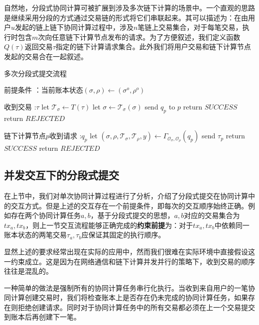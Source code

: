 自然地，分段式协同计算可被扩展到涉及多次链下计算的场景中。一个直观的思路是继续采用分段的方式通过交易链的形式将它们串联起来。其可以描述为：在由用户$u$发起的链上链下协同计算过程中，涉及$n$笔链上交易集合，对于每笔交易，执行时包含$m$次向任意链下计算节点发布的请求。为了方便叙述，我们定义函数$Q(\tau)$返回交易$\tau$指定的链下计算请求集合。此外我们将用户交易和链下计算节点发起的交易合在一起叙述。
\begin{breakablealgorithm}
    \caption{多次分段式提交流程}
    \label{alg:ch4-2}
    \begin{algorithmic} 
        \item[前提条件]：当前账本状态$(\sigma, \rho) \leftarrow (\sigma^o, \rho^o)$
        \item[收到交易]:$\tau$
        \STATE let $\mathcal{T}_\sigma \leftarrow T(\tau)$
        \STATE let $\sigma \leftarrow \mathcal{T}_\sigma(\sigma)$
        \STATE send $q_p$ to $p$
        \ENDFOR
        \STATE return $SUCCESS$
        \ENDIF
        \STATE return $REJECTED$
        \item[链下计算节点$p$收到请求]:$q_p$
        \STATE let $(\sigma, \rho, \mathcal{T}_\sigma, \mathcal{T}_\rho, y) \leftarrow \Gamma_{\mathcal{O}_\sigma, \mathcal{O}_\rho}(q_p)$
        \IF {$\sigma \neq \perp \wedge \rho \neq \perp$} 
        \STATE send $\tau_p$
        \STATE return $SUCCESS$
        \ENDIF
        \STATE return $REJECTED$
    \end{algorithmic}
\end{breakablealgorithm}

\subsection{并发交互下的分段式提交}
在上节中，我们对单次协同计算过程进行了分析，介绍了分段式提交在协同计算中的交互方式。但是上述的交互存在一个前提条件，即每次的交互顺序始终正确。例如存在两个协同计算任务$a, b$，基于分段式提交的思想，$a, b$对应的交易集合为$tx_a, tx_b$，则上一节交互流程能够正确完成的\textbf{约束前提}为：对于$tx_a, tx_b$中依赖同一账本状态的两笔交易$\tau_a, \tau_b$应保证其固定的执行顺序。

显然上述的要求经常出现在实际的应用中，然而我们很难在实际环境中直接假设这一约束成立。这是因为在网络通信和链下计算并发并行的策略下，收到交易的顺序往往是混乱的。

一种简单的做法是强制所有的协同计算任务串行化执行。当收到来自用户的一笔协同计算创建交易时，我们将检查账本上是否存在仍未完成的协同计算任务，如果存在则拒绝创建请求。同时对于协同计算任务中的所有交易都必须在上一个交易提交到账本后再创建下一笔。

